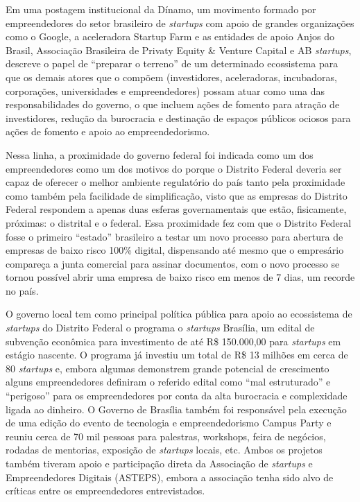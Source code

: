 Em uma postagem institucional da Dínamo, um movimento formado por empreendedores do setor brasileiro de \textit{startups} com apoio de grandes organizações como o Google, a aceleradora Startup Farm e as entidades de apoio Anjos do Brasil, Associação Brasileira de Privaty Equity \& Venture Capital e AB \textit{startups},  descreve o papel de ``preparar o terreno'' de um determinado ecossistema para que os demais atores que o compõem (investidores, aceleradoras, incubadoras, corporações, universidades e empreendedores) possam atuar como uma das responsabilidades do governo, o que incluem ações de fomento para atração de investidores, redução da burocracia e destinação de espaços públicos ociosos para ações de fomento e apoio ao empreendedorismo.

Nessa linha, a proximidade do governo federal foi indicada como um dos empreendedores como um dos motivos do porque o Distrito Federal deveria ser capaz de oferecer o melhor ambiente regulatório do país tanto pela proximidade como também pela facilidade de simplificação, visto que as empresas do Distrito Federal respondem a apenas duas esferas governamentais que estão, fisicamente, próximas: o  distrital e o federal. Essa proximidade fez com que o Distrito Federal fosse o primeiro ``estado'' brasileiro a testar um novo processo para abertura de empresas de baixo risco 100\% digital, dispensando até mesmo que o empresário compareça a junta comercial para assinar documentos, com o novo processo se tornou possível abrir uma empresa de baixo risco em menos de 7 dias, um recorde no país.

O governo local tem como principal política pública para apoio ao ecossistema de \textit{startups} do Distrito Federal o programa o \textit{startups} Brasília, um edital de subvenção econômica para investimento de até R\$ 150.000,00 para \textit{startups} em estágio nascente. O programa já investiu um total de R\$ 13 milhões em cerca de 80 \textit{startups} e, embora algumas demonstrem grande potencial de crescimento alguns empreendedores definiram o referido edital como ``mal estruturado'' e ``perigoso'' para os empreendedores por conta da alta burocracia e complexidade ligada ao dinheiro. O Governo de Brasília também foi responsável pela execução de uma edição do evento de tecnologia e empreendedorismo Campus Party e reuniu cerca de 70 mil pessoas para palestras, workshops, feira de negócios, rodadas de mentorias, exposição de \textit{startups} locais, etc. Ambos os projetos também tiveram apoio e participação direta da Associação de \textit{startups} e Empreendedores Digitais (ASTEPS), embora a associação tenha sido alvo de críticas entre os empreendedores entrevistados.

